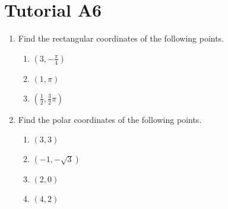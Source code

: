 \section{Tutorial A6}

\begin{problem}
    \begin{enumerate}
        \item Find the rectangular coordinates of the following points.
        \begin{enumerate}
            \item $(3, -\frac\pi4)$
            \item $(1, \pi)$
            \item $(\frac12, \frac32 \pi)$
        \end{enumerate}
        \item Find the polar coordinates of the following points.
        \begin{enumerate}
            \item $(3, 3)$
            \item $(-1, -\sqrt3)$
            \item $(2, 0)$
            \item $(4, 2)$
        \end{enumerate}
    \end{enumerate}
\end{problem}
